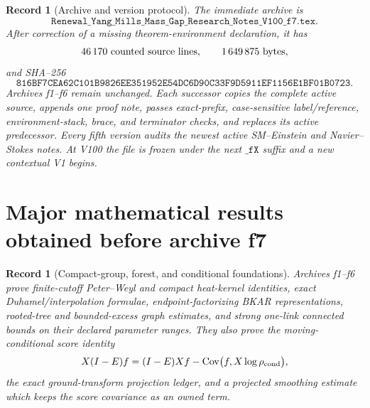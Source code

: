 \documentclass[11pt,oneside]{book}
\newtheorem{record}[theorem]{Record}
\theoremstyle{definition}
\theoremstyle{remark}
\begin{document}
\begin{record}[Archive and version protocol]
\label{rec:e8v1-protocol}
The immediate archive is
\[
 \texttt{Renewal\_Yang\_Mills\_Mass\_Gap\_Research\_Notes\_V100\_f7.tex}.
\]
After correction of a missing theorem-environment declaration, it has
\[
 46\,170\ \hbox{counted source lines},\qquad
 1\,649\,875\ \hbox{bytes},
\]
and SHA--256
\[
 \texttt{816BF7CEA62C101B9826EE351952E54DC6D90C33F9D5911EF1156E1BF01B0723}.
                                                        \label{eq:e8v1-f7-hash}
\]
Archives f1--f6 remain unchanged.  Each successor copies the complete
active source, appends one proof note, passes exact-prefix,
case-sensitive label/reference, environment-stack, brace, and
terminator checks, and replaces its active predecessor.  Every fifth
version audits the newest active SM--Einstein and Navier--Stokes notes.
At V100 the file is frozen under the next \(\texttt{\_fX}\) suffix and
a new contextual V1 begins.
\end{record}

\section{Major mathematical results obtained before archive f7}
\label{sec:e8v1-legacy}

\begin{record}[Compact-group, forest, and conditional foundations]
\label{rec:e8v1-foundations}
Archives f1--f6 prove finite-cutoff Peter--Weyl and compact heat-kernel
identities, exact Duhamel/interpolation formulae, endpoint-factorizing
BKAR representations, rooted-tree and bounded-excess graph estimates,
and strong one-link connected bounds on their declared parameter
ranges.  They also prove the moving-conditional score identity
\[
 X(I-E)f
 =
 (I-E)Xf-\operatorname{Cov}
 \bigl(f,X\log\rho_{\rm cond}\bigr),                 \label{eq:e8v1-score-legacy}
\]
the exact ground-transform projection ledger, and a projected smoothing
estimate which keeps the score covariance as an owned term.
\end{record}
\end{document}
